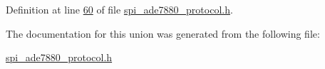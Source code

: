 Definition at line \hyperlink{a00041_source_l00060}{60} of file \hyperlink{a00041_source}{spi\-\_\-ade7880\-\_\-protocol.\-h}.



The documentation for this union was generated from the following file\-:\begin{DoxyCompactItemize}
\item 
\hyperlink{a00041}{spi\-\_\-ade7880\-\_\-protocol.\-h}\end{DoxyCompactItemize}
